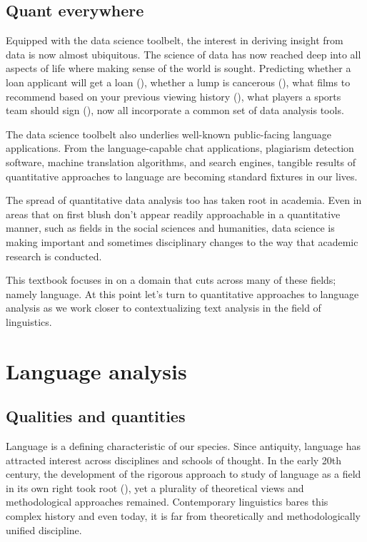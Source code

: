 \documentclass[
  letterpaper,
  DIV=11,
  numbers=noendperiod]{scrreprt}
\theoremstyle{definition}
\theoremstyle{remark}
\begin{document}
\subsection{Quant everywhere}\label{quant-everywhere}

Equipped with the data science toolbelt, the interest in deriving
insight from data is now almost ubiquitous. The science of data has now
reached deep into all aspects of life where making sense of the world is
sought. Predicting whether a loan applicant will get a loan
(), whether a lump is
cancerous (),
what films to recommend based on your previous viewing history
(), what
players a sports team should sign (), now all incorporate a common set of data analysis tools.

The data science toolbelt also underlies well-known public-facing
language applications. From the language-capable chat applications,
plagiarism detection software, machine translation algorithms, and
search engines, tangible results of quantitative approaches to language
are becoming standard fixtures in our lives.

The spread of quantitative data analysis too has taken root in academia.
Even in areas that on first blush don't appear readily approachable in a
quantitative manner, such as fields in the social sciences and
humanities, data science is making important and sometimes disciplinary
changes to the way that academic research is conducted.

This textbook focuses in on a domain that cuts across many of these
fields; namely language. At this point let's turn to quantitative
approaches to language analysis as we work closer to contextualizing
text analysis in the field of linguistics.

\section{Language analysis}\label{language-analysis}

\subsection{Qualities and quantities}\label{qualities-and-quantities}

Language is a defining characteristic of our species. Since antiquity,
language has attracted interest across disciplines and schools of
thought. In the early 20th century, the development of the rigorous
approach to study of language as a field in its own right took root
(), yet a plurality of
theoretical views and methodological approaches remained. Contemporary
linguistics bares this complex history and even today, it is far from
theoretically and methodologically unified discipline.
\end{document}

